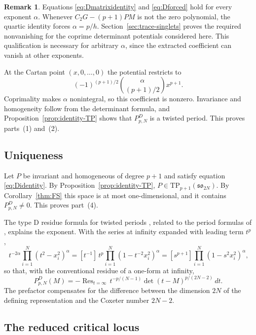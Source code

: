 \documentclass[10pt,reqno]{amsart}
\numberwithin{equation}{section}
\theoremstyle{plain}
\theoremstyle{definition}
\newtheorem{remark}[theorem]{Remark}
\DeclareMathOperator{\Res}{Res}
\newcommand{\TP}{\mathrm{TP}}
\begin{document}
\begin{remark}\label{rem:D-exponent}
Equations \eqref{eq:Dmatrixidentity} and \eqref{eq:Dforced} hold for every exponent $\alpha$. Whenever $C_2G-(p+1)PM$ is not the zero polynomial, the quartic identity forces $\alpha=p/h$. Section~\ref{sec:trace-singlets} proves the required nonvanishing for the coprime determinant potentials considered here. This qualification is necessary for arbitrary $\alpha$, since the extracted coefficient can vanish at other exponents.
\end{remark}

At the Cartan point $(x,0,\dots,0)$ the potential restricts to
\begin{equation*}
	(-1)^{(p+1)/2}\binom{\alpha}{(p+1)/2}x^{p+1}.
\end{equation*}
Coprimality makes $\alpha$ nonintegral, so this coefficient is nonzero. Invariance and homogeneity follow from the determinant formula, and Proposition~\ref{prop:identity-TP} shows that $P^D_{p,N}$ is a twisted period. This proves parts~(1) and~(2).

\subsection{Uniqueness}

Let $P$ be invariant and homogeneous of degree $p+1$ and satisfy equation \eqref{eq:Didentity}. By Proposition~\ref{prop:identity-TP}, $P\in\TP_{p+1}(\mathfrak{so}_{2N})$. By Corollary~\ref{thm:FS} this space is at most one-dimensional, and it contains $P^D_{p,N}\neq0$. This proves part~(4).

The type D residue formula for twisted periods \cite[Section~5]{FS}, related to the period formulas of \cite{EYY}, explains the exponent. With the series at infinity expanded with leading term $t^p$,
\begin{equation*}
	[t^{-1}]\,t^{-2\alpha}\prod_{i=1}^N(t^2-x_i^2)^\alpha=[t^{-1}]\,t^p\prod_{i=1}^N(1-t^{-2}x_i^2)^\alpha=[s^{p+1}]\prod_{i=1}^N(1-s^2x_i^2)^\alpha,
\end{equation*}
so that, with the conventional residue of a one-form at infinity,
\begin{equation}\label{eq:Dresidue2}
	P^D_{p,N}(M)=-\Res_{t=\infty}\,t^{-p/(N-1)}\det(t-M)^{p/(2N-2)}\,dt .
\end{equation}
The prefactor compensates for the difference between the dimension $2N$ of the defining representation and the Coxeter number $2N-2$.

\subsection{The reduced critical locus}
\end{document}
